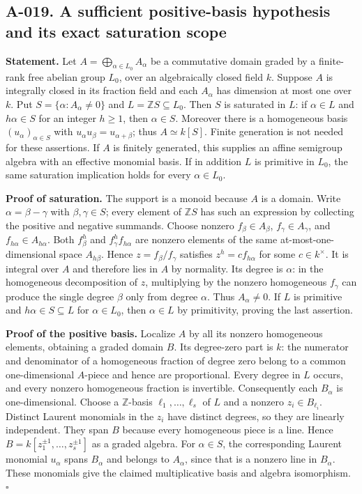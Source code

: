 \subsection*{A-019. A sufficient positive-basis hypothesis and its exact saturation scope}
\textbf{Statement.} Let $A=\bigoplus_{\alpha\in L_0}A_\alpha$ be
a commutative domain graded by a finite-rank free abelian group $L_0$, over
an algebraically closed field $k$. Suppose $A$ is integrally
closed in its fraction field and each $A_\alpha$ has dimension
at most one over $k$. Put
$S=\{\alpha:A_\alpha\ne0\}$ and $L=\mathbb ZS\subseteq L_0$.
Then $S$ is saturated in $L$: if $\alpha\in L$ and
$h\alpha\in S$ for an integer $h\geq1$, then $\alpha\in S$.
Moreover there is a homogeneous basis $(u_\alpha)_{\alpha\in S}$
with $u_\alpha u_\beta=u_{\alpha+\beta}$; thus
$A\simeq k[S]$. Finite generation is not needed for these
assertions. If $A$ is finitely generated, this supplies an affine
semigroup algebra with an effective monomial basis. If in
addition $L$ is primitive in $L_0$, the same saturation implication
holds for every $\alpha\in L_0$.

\textbf{Proof of saturation.} The support is a monoid because
$A$ is a domain. Write $\alpha=\beta-\gamma$ with
$\beta,\gamma\in S$; every element of $\mathbb ZS$ has such an
expression by collecting the positive and negative summands.
Choose nonzero $f_\beta\in A_\beta$,
$f_\gamma\in A_\gamma$, and $f_{h\alpha}\in A_{h\alpha}$.
Both $f_\beta^h$ and $f_\gamma^h f_{h\alpha}$ are nonzero
elements of the same at-most-one-dimensional space $A_{h\beta}$.
Hence $z=f_\beta/f_\gamma$ satisfies
$z^h=c f_{h\alpha}$ for some $c\in k^\times$.
It is integral over $A$ and therefore lies in $A$ by normality.
Its degree is $\alpha$: in the homogeneous decomposition of
$z$, multiplying by the nonzero homogeneous $f_\gamma$ can
produce the single degree $\beta$ only from degree $\alpha$.
Thus $A_\alpha\ne0$. If $L$ is primitive and
$h\alpha\in S\subseteq L$ for $\alpha\in L_0$, then
$\alpha\in L$ by primitivity, proving the last assertion.

\textbf{Proof of the positive basis.} Localize $A$ by all its
nonzero homogeneous elements, obtaining a graded domain $B$.
Its degree-zero part is $k$: the numerator and denominator of a
homogeneous fraction of degree zero belong to a common
one-dimensional $A$-piece and hence are proportional. Every
degree in $L$ occurs, and every nonzero homogeneous fraction is
invertible. Consequently each $B_\alpha$ is one-dimensional.
Choose a $\mathbb Z$-basis $\ell_1,\ldots,\ell_s$ of $L$ and
a nonzero $z_i\in B_{\ell_i}$. Distinct Laurent monomials in
the $z_i$ have distinct degrees, so they are linearly independent.
They span $B$ because every homogeneous piece is a line. Hence
$B=k[z_1^{\pm1},\ldots,z_s^{\pm1}]$ as a graded algebra.
For $\alpha\in S$, the corresponding Laurent monomial
$u_\alpha$ spans $B_\alpha$ and belongs to $A_\alpha$, since
that is a nonzero line in $B_\alpha$. These monomials give the
claimed multiplicative basis and algebra isomorphism.
\hfill$\square$

